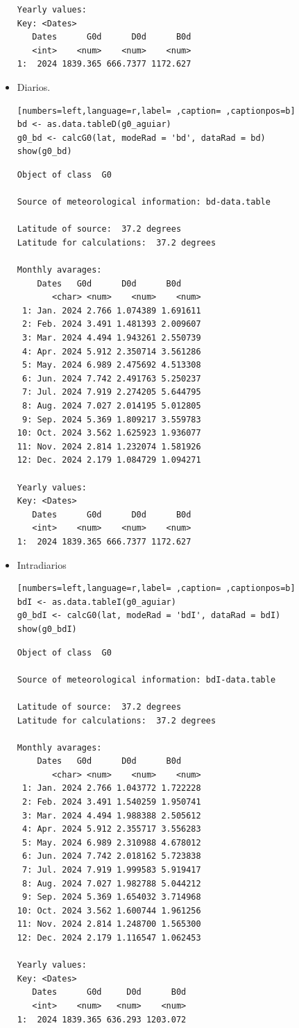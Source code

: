 \begin{itemize}
\begin{verbatim}
Yearly values:
Key: <Dates>
   Dates      G0d      D0d      B0d
   <int>    <num>    <num>    <num>
1:  2024 1839.365 666.7377 1172.627
\end{verbatim}

\item Diarios.
\begin{lstlisting}[numbers=left,language=r,label= ,caption= ,captionpos=b]
bd <- as.data.tableD(g0_aguiar)
g0_bd <- calcG0(lat, modeRad = 'bd', dataRad = bd)
show(g0_bd)
\end{lstlisting}

\begin{verbatim}
Object of class  G0 

Source of meteorological information: bd-data.table 

Latitude of source:  37.2 degrees
Latitude for calculations:  37.2 degrees

Monthly avarages:
	Dates   G0d      D0d      B0d
       <char> <num>    <num>    <num>
 1: Jan. 2024 2.766 1.074389 1.691611
 2: Feb. 2024 3.491 1.481393 2.009607
 3: Mar. 2024 4.494 1.943261 2.550739
 4: Apr. 2024 5.912 2.350714 3.561286
 5: May. 2024 6.989 2.475692 4.513308
 6: Jun. 2024 7.742 2.491763 5.250237
 7: Jul. 2024 7.919 2.274205 5.644795
 8: Aug. 2024 7.027 2.014195 5.012805
 9: Sep. 2024 5.369 1.809217 3.559783
10: Oct. 2024 3.562 1.625923 1.936077
11: Nov. 2024 2.814 1.232074 1.581926
12: Dec. 2024 2.179 1.084729 1.094271

Yearly values:
Key: <Dates>
   Dates      G0d      D0d      B0d
   <int>    <num>    <num>    <num>
1:  2024 1839.365 666.7377 1172.627
\end{verbatim}

\item Intradiarios
\begin{lstlisting}[numbers=left,language=r,label= ,caption= ,captionpos=b]
bdI <- as.data.tableI(g0_aguiar)
g0_bdI <- calcG0(lat, modeRad = 'bdI', dataRad = bdI)
show(g0_bdI)
\end{lstlisting}

\begin{verbatim}
Object of class  G0 

Source of meteorological information: bdI-data.table 

Latitude of source:  37.2 degrees
Latitude for calculations:  37.2 degrees

Monthly avarages:
	Dates   G0d      D0d      B0d
       <char> <num>    <num>    <num>
 1: Jan. 2024 2.766 1.043772 1.722228
 2: Feb. 2024 3.491 1.540259 1.950741
 3: Mar. 2024 4.494 1.988388 2.505612
 4: Apr. 2024 5.912 2.355717 3.556283
 5: May. 2024 6.989 2.310988 4.678012
 6: Jun. 2024 7.742 2.018162 5.723838
 7: Jul. 2024 7.919 1.999583 5.919417
 8: Aug. 2024 7.027 1.982788 5.044212
 9: Sep. 2024 5.369 1.654032 3.714968
10: Oct. 2024 3.562 1.600744 1.961256
11: Nov. 2024 2.814 1.248700 1.565300
12: Dec. 2024 2.179 1.116547 1.062453

Yearly values:
Key: <Dates>
   Dates      G0d     D0d      B0d
   <int>    <num>   <num>    <num>
1:  2024 1839.365 636.293 1203.072
\end{verbatim}
\end{itemize}

